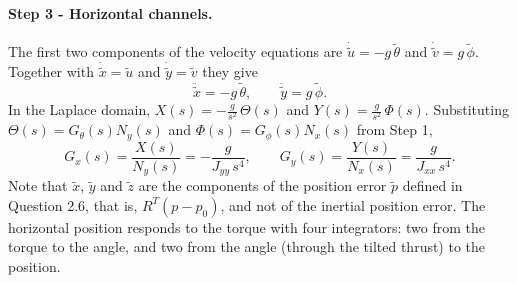 \paragraph{Step 3 - Horizontal channels.}
The first two components of the velocity equations are $\dot{\tilde u} = -g\,\tilde\theta$ and $\dot{\tilde v} = g\,\tilde\phi$.
Together with $\dot{\tilde x} = \tilde u$ and $\dot{\tilde y} = \tilde v$ they give
\begin{equation*}
\ddot{\tilde x} = -g\,\tilde\theta, \qquad \ddot{\tilde y} = g\,\tilde\phi .
\end{equation*}
In the Laplace domain, $X(s) = -\frac{g}{s^2}\,\Theta(s)$ and $Y(s) = \frac{g}{s^2}\,\Phi(s)$.
Substituting $\Theta(s) = G_\theta(s) N_y(s)$ and $\Phi(s) = G_\phi(s) N_x(s)$ from Step 1,
\begin{equation*}
G_x(s) = \frac{X(s)}{N_y(s)} = -\frac{g}{J_{yy}\, s^4}, \qquad
G_y(s) = \frac{Y(s)}{N_x(s)} = \frac{g}{J_{xx}\, s^4}.
\end{equation*}
Note that $\tilde x$, $\tilde y$ and $\tilde z$ are the components of the position error $\tilde p$ defined in Question 2.6, that is, $R^T(p - p_0)$, and not of the inertial position error.
The horizontal position responds to the torque with four integrators: two from the torque to the angle, and two from the angle (through the tilted thrust) to the position.
